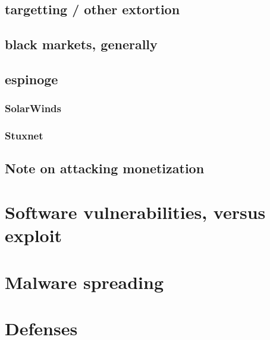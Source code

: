 \subsection{targetting / other extortion}


\subsection{black markets, generally}


\subsection{espinoge}


\subsubsection{SolarWinds}


\subsubsection{Stuxnet}


\subsection{Note on attacking monetization}


\section{Software vulnerabilities, versus exploit}


\section{Malware spreading}


\section{Defenses}



